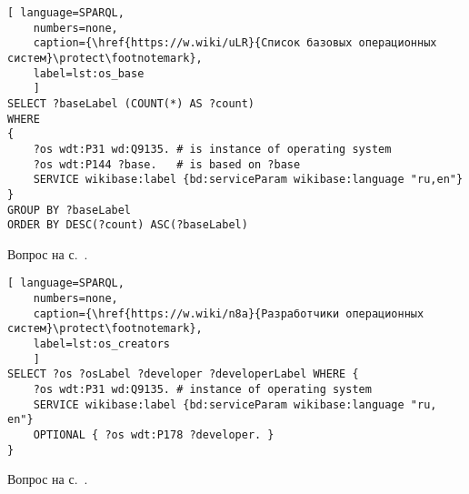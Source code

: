 
\begin{task}
	\label{answer:os_base}

\begin{lstlisting}[ language=SPARQL, 
    numbers=none,
    caption={\href{https://w.wiki/uLR}{Список базовых операционных систем}\protect\footnotemark},
	label=lst:os_base
	]
SELECT ?baseLabel (COUNT(*) AS ?count)
WHERE
{
	?os wdt:P31 wd:Q9135. # is instance of operating system
	?os wdt:P144 ?base.   # is based on ?base
	SERVICE wikibase:label {bd:serviceParam wikibase:language "ru,en"}
}
GROUP BY ?baseLabel
ORDER BY DESC(?count) ASC(?baseLabel)\end{lstlisting}

\small{Вопрос на с.~\pageref{lst:base_of_operating_systems}.}
\end{task}

\begin{task}
	\label{answer:what_system_created}

\begin{lstlisting}[ language=SPARQL, 
    numbers=none,
    caption={\href{https://w.wiki/n8a}{Разработчики операционных систем}\protect\footnotemark},
	label=lst:os_creators
	]
SELECT ?os ?osLabel ?developer ?developerLabel WHERE {
	?os wdt:P31 wd:Q9135. # instance of operating system
	SERVICE wikibase:label {bd:serviceParam wikibase:language "ru, en"}
	OPTIONAL { ?os wdt:P178 ?developer. }
}\end{lstlisting}

\small{Вопрос на с.~\pageref{lst:inception_time_of_operating_systems}.}
\end{task}

